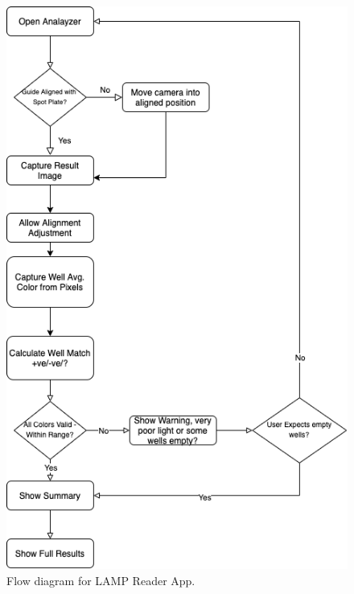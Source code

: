 \begin{figure}[h]
    \centering
    \includegraphics[width=\linewidth]{mnt/fig/lamp-reader-app-flow-diagram}
    \caption{Flow diagram for LAMP Reader App.}
    \label{fig:my_label}
\end{figure}
